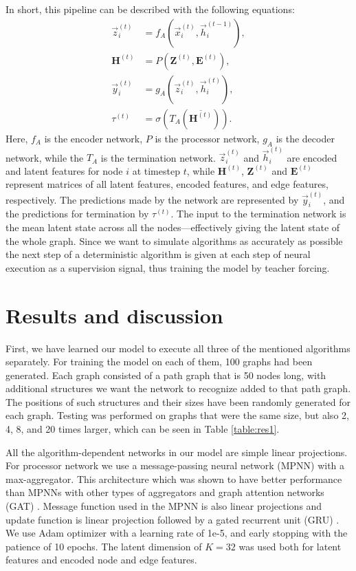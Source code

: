 \documentclass{article}
\begin{document}
In short, this pipeline can be described with the following equations:
\begin{align}
    \vec{z}_i^{(t)} &= f_A \left( \vec{x}_i^{(t)}, \vec{h}_i^{(t-1)} \right),\\
    \mathbf{H}^{(t)} &= P \left( \mathbf{Z}^{(t)}, \mathbf{E}^{(t)} \right),\\
    \vec{y}_i^{(t)} &= g_A \left( \vec{z}_i^{(t)}, \vec{h}_i^{(t)} \right),\\
    \tau^{(t)} &= \sigma \left( T_A \left( \overline{\mathbf{H}^{(t)} } \right) \right).
\end{align}
Here, $f_A$ is the encoder network, $P$ is the processor network, $g_A$ is the decoder network, while the $T_A$ is the termination network. $\vec{z}_i^{(t)}$ and $\vec{h}_i^{(t)}$ are encoded and latent features for node $i$ at timestep $t$, while $\mathbf{H}^{(t)}$, $\mathbf{Z}^{(t)}$ and $\mathbf{E}^{(t)}$ represent matrices of all latent features, encoded features, and edge features, respectively. The predictions made by the network are represented by $\vec{y}_i^{(t)}$, and the predictions for termination by $\tau^{(t)}$. The input to the termination network is the mean latent state across all the nodes---effectively giving the latent state of the whole graph. Since we want to simulate algorithms as accurately as possible the next step of a deterministic algorithm is given at each step of neural execution as a supervision signal, thus training the model by teacher forcing.



\section{Results and discussion}

First, we have learned our model to execute all three of the mentioned algorithms separately. For training the model on each of them, 100 graphs had been generated. Each graph consisted of a path graph that is 50 nodes long, with additional structures we want the network to recognize added to that path graph. The positions of such structures and their sizes have been randomly generated for each graph. Testing was performed on graphs that were the same size, but also 2, 4, 8, and 20 times larger, which can be seen in Table \ref{table:res1}.

All the algorithm-dependent networks in our model are simple linear projections. For processor network we use a message-passing neural network (MPNN) with a max-aggregator. This architecture which was shown to have better performance than MPNNs with other types of aggregators and graph attention networks (GAT) \cite{velivckovic2017graph}. Message function used in the MPNN is also linear projections and update function is linear projection followed by a gated recurrent unit (GRU) \cite{cho2014learning}. We use Adam optimizer \cite{kingma2014adam} with a learning rate of 1e-5, and early stopping with the patience of 10 epochs. The latent dimension of $K = 32$ was used both for latent features and encoded node and edge features.
\end{document}

